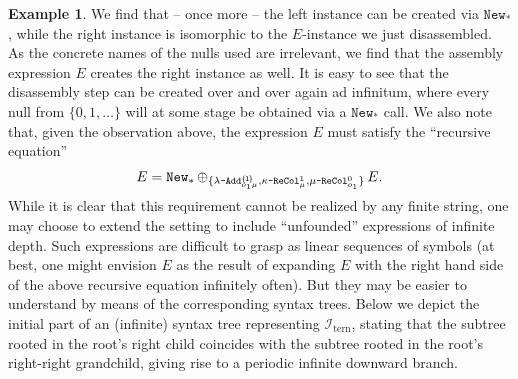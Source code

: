 \documentclass[10pt,a4paper]{amsart}
\theoremstyle{definition}
\newtheorem{exa}[exa]{Example}
\numberwithin{equation}{section}
\theoremstyle{plain}
\theoremstyle{definition}
\newtheorem{example}[example]{Example}
\theoremstyle{myexample}
\renewenvironment{example}%
{
	\begin{shaded*}	
		\vspace{-1.5ex}
		\begin{exa}%
		}{
		\end{exa}
		\vspace{-1.5ex}
	\end{shaded*}
}
\theoremstyle{plain}
\theoremstyle{definition}
\newcommand{\instance}{\mathcal{I}}
\newcommand{\inst}{\instance}
\newcommand{\origcol}{o}
\newcommand{\newanon}{\pred{New}_{\const{*}}} %
\newcommand{\cadd}[4]{#4\pred{\texttt{-}Add}^{#3}_{#1#2}} %
\newcommand{\recol}[2]{#2\pred{\texttt{-}ReCol}_{#1}}
\newcommand{\pred}[1]{\mathtt{#1}}
\newcommand{\const}[1]{\mathtt{#1}}
\begin{document}
\begin{example}
\noindent We find that -- once more -- the left instance can be created via $\newanon$, while the right instance is isomorphic to the $E$-instance we just disassembled. As the concrete names of the nulls used are irrelevant, we find that the assembly expression $E$ creates the right instance as well. It is easy to see that the disassembly step can be created over and over again ad infinitum, where every null from $\{0,1,\ldots\}$ will at some stage be obtained via a $\newanon$ call. We also note that, given the observation above, the expression $E$ must satisfy the ``recursive equation'' $$E = \newanon \,\smash{\oplus_{\{\cadd{\origcol_1}{\mu}{\smash{\{\hspace{-1pt}1\hspace{-1pt}\}}}{\lambda},\recol{\mu}{\kappa}^1,\recol{\origcol_{1}}{\mu}^0\}}}\,E.$$
While it is clear that this requirement cannot be realized by any finite string, one may choose to extend the setting to include ``unfounded'' expressions of infinite depth. Such expressions are difficult to grasp as linear sequences of symbols (at best, one might envision $E$ as the result of expanding $E$ with the right hand side of the above recursive equation infinitely often). But they may be easier to understand by means of the corresponding syntax trees. Below we depict the initial part of an (infinite) syntax tree representing $\inst_\mathrm{tern}$, stating that the subtree rooted in the root's right child coincides with the subtree rooted in the root's right-right grandchild, giving rise to a periodic infinite downward branch. 

\hspace{15ex}
\end{example}
\end{document}
